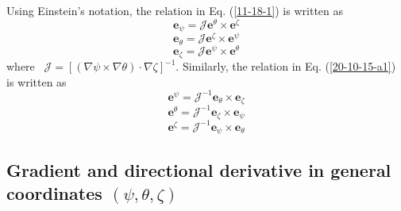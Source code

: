 \documentclass{article}
\begin{document}
Using Einstein's notation, the relation in Eq. (\ref{11-18-1}) is written as
\begin{equation}
  \mathbf{e}_{\psi} = \mathcal{J} \mathbf{e}^{\theta} \times
  \mathbf{e}^{\zeta}
\end{equation}
\begin{equation}
  \mathbf{e}_{\theta} = \mathcal{J} \mathbf{e}^{\zeta} \times
  \mathbf{e}^{\psi}
\end{equation}
\begin{equation}
  \mathbf{e}_{\zeta} = \mathcal{J} \mathbf{e}^{\psi} \times
  \mathbf{e}^{\theta}
\end{equation}
where \ $\mathcal{J} = [(\nabla \psi \times \nabla \theta) \cdot \nabla
\zeta]^{- 1}$. Similarly, the relation in Eq. (\ref{20-10-15-a1}) is written
as
\begin{equation}
  \mathbf{e}^{\psi} = \mathcal{J}^{- 1} \mathbf{e}_{\theta} \times
  \mathbf{e}_{\zeta}
\end{equation}
\begin{equation}
  \mathbf{e}^{\theta} = \mathcal{J}^{- 1} \mathbf{e}_{\zeta} \times
  \mathbf{e}_{\psi}
\end{equation}
\begin{equation}
  \mathbf{e}^{\zeta} = \mathcal{J}^{- 1} \mathbf{e}_{\psi} \times
  \mathbf{e}_{\theta}
\end{equation}

\subsection{Gradient and directional derivative in general coordinates $(\psi,
\theta, \zeta)$}
\end{document}
